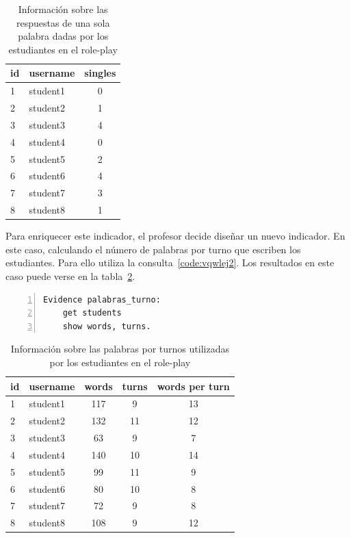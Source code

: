\begin{table}
	\centering
	\caption{Información sobre las respuestas de una sola palabra dadas por los estudiantes en el role-play}
	\label{tab:EvsListEj1}
	\begin{tabular}{|l|l|c|}
		\hline
		id & username & singles \\
		\hline
		\hline
		1 & student1 & 0  \\
		\hline
		2 & student2 & 1  \\
		\hline
		3 & student3 & 4  \\
		\hline
		4 & student4 & 0  \\
		\hline
		5 & student5 & 2  \\
		\hline
		6 & student6 & 4  \\
		\hline
		7 & student7 & 3  \\
		\hline
		8 & student8 & 1  \\
		\hline
	\end{tabular}
\end{table}

Para enriquecer este indicador, el profesor decide diseñar un nuevo indicador. En este caso, calculando el número de palabras por turno que escriben los estudiantes. Para ello utiliza la consulta~\ref{code:vqwlej2}. Los resultados en este caso puede verse en la tabla~\ref{tab:EvsListEj2}.

\begin{lstlisting}[caption=Respuestas de una sola palabra, label=code:vqwlej2,numbers=left, captionpos=b, morekeywords={Evidence,get, students, single, show, words, sentences, turns, time, points}]
Evidence palabras_turno:
    get students
    show words, turns.
\end{lstlisting}

\begin{table}
	\centering
	\caption{Información sobre las palabras por turnos utilizadas por los estudiantes en el role-play}
	\label{tab:EvsListEj2}
	\begin{tabular}{|l|l|c|c|c|}
		\hline
		id & username & words & turns & words per turn \\
		\hline
		\hline
		1 & student1 & 117 & 9 & 13 \\
		\hline
		2 & student2 & 132 & 11 & 12  \\
		\hline
		3 & student3 & 63 & 9 & 7  \\
		\hline
		4 & student4 & 140 & 10 & 14  \\
		\hline
		5 & student5 & 99  & 11 & 9 \\
		\hline
		6 & student6 & 80 & 10 & 8  \\
		\hline
		7 & student7 & 72 & 9 & 8  \\
		\hline
		8 & student8 & 108 & 9 & 12   \\
		\hline
	\end{tabular}
\end{table}

